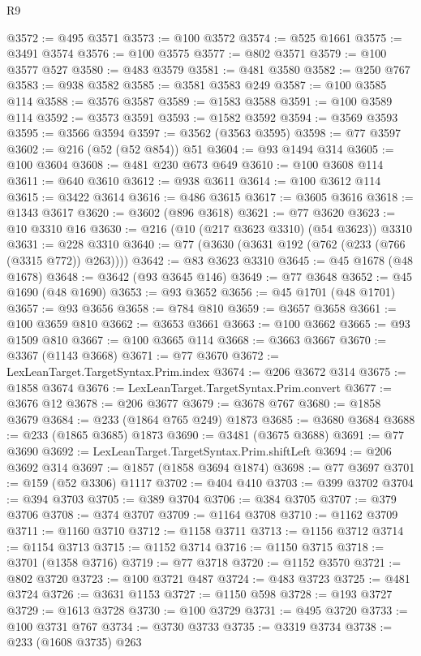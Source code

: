 \begin{lexlean}{R9}
\begin{coremodule}
@3572 := @495 @3571
@3573 := @100 @3572
@3574 := @525 @1661
@3575 := @3491 @3574
@3576 := @100 @3575
@3577 := @802 @3571
@3579 := @100 @3577 @527
@3580 := @483 @3579
@3581 := @481 @3580
@3582 := @250 @767
@3583 := @938 @3582
@3585 := @3581 @3583 @249
@3587 := @100 @3585 @114
@3588 := @3576 @3587
@3589 := @1583 @3588
@3591 := @100 @3589 @114
@3592 := @3573 @3591
@3593 := @1582 @3592
@3594 := @3569 @3593
@3595 := @3566 @3594
@3597 := @3562 (@3563 @3595)
@3598 := @77 @3597
@3602 := @216 (@52 (@52 @854)) @51
@3604 := @93 @1494 @314
@3605 := @100 @3604
@3608 := @481 @230 @673 @649
@3610 := @100 @3608 @114
@3611 := @640 @3610
@3612 := @938 @3611
@3614 := @100 @3612 @114
@3615 := @3422 @3614
@3616 := @486 @3615
@3617 := @3605 @3616
@3618 := @1343 @3617
@3620 := @3602 (@896 @3618)
@3621 := @77 @3620
@3623 := @10 @3310 @16
@3630 := @216 (@10 (@217 @3623 @3310) (@54 @3623)) @3310
@3631 := @228 @3310
@3640 := @77 (@3630 (@3631 @192 (@762 (@233 (@766 (@3315 @772)) @263))))
@3642 := @83 @3623 @3310
@3645 := @45 @1678 (@48 @1678)
@3648 := @3642 (@93 @3645 @146)
@3649 := @77 @3648
@3652 := @45 @1690 (@48 @1690)
@3653 := @93 @3652
@3656 := @45 @1701 (@48 @1701)
@3657 := @93 @3656
@3658 := @784 @810
@3659 := @3657 @3658
@3661 := @100 @3659 @810
@3662 := @3653 @3661
@3663 := @100 @3662
@3665 := @93 @1509 @810
@3667 := @100 @3665 @114
@3668 := @3663 @3667
@3670 := @3367 (@1143 @3668)
@3671 := @77 @3670
@3672 := LexLeanTarget.TargetSyntax.Prim.index
@3674 := @206 @3672 @314
@3675 := @1858 @3674
@3676 := LexLeanTarget.TargetSyntax.Prim.convert
@3677 := @3676 @12
@3678 := @206 @3677
@3679 := @3678 @767
@3680 := @1858 @3679
@3684 := @233 (@1864 @765 @249) @1873
@3685 := @3680 @3684
@3688 := @233 (@1865 @3685) @1873
@3690 := @3481 (@3675 @3688)
@3691 := @77 @3690
@3692 := LexLeanTarget.TargetSyntax.Prim.shiftLeft
@3694 := @206 @3692 @314
@3697 := @1857 (@1858 @3694 @1874)
@3698 := @77 @3697
@3701 := @159 (@52 @3306) @1117
@3702 := @404 @410
@3703 := @399 @3702
@3704 := @394 @3703
@3705 := @389 @3704
@3706 := @384 @3705
@3707 := @379 @3706
@3708 := @374 @3707
@3709 := @1164 @3708
@3710 := @1162 @3709
@3711 := @1160 @3710
@3712 := @1158 @3711
@3713 := @1156 @3712
@3714 := @1154 @3713
@3715 := @1152 @3714
@3716 := @1150 @3715
@3718 := @3701 (@1358 @3716)
@3719 := @77 @3718
@3720 := @1152 @3570
@3721 := @802 @3720
@3723 := @100 @3721 @487
@3724 := @483 @3723
@3725 := @481 @3724
@3726 := @3631 @1153
@3727 := @1150 @598
@3728 := @193 @3727
@3729 := @1613 @3728
@3730 := @100 @3729
@3731 := @495 @3720
@3733 := @100 @3731 @767
@3734 := @3730 @3733
@3735 := @3319 @3734
@3738 := @233 (@1608 @3735) @263

\end{coremodule}
\end{lexlean}

